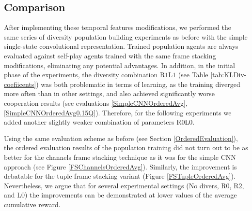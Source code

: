 \subsection{Comparison}
After implementing these temporal features modifications, we performed the same series of diversity population building experiments as before with the simple single-state convolutional representation.
Trained population agents are always evaluated against self-play agents trained with the same frame stacking modifications, eliminating any potential advantages.
In addition, in the initial phase of the experiments, the diversity combination R$1$L$1$ (see Table \ref{tab:KLDiv-coefiicents}) was both problematic in terms of learning, as the training diverged more often than in other settings, and also achieved significantly worse cooperation results (see evaluations \ref{SimpleCNNOrderedAvg}, \ref{SimpleCNNOrderedAvg0.15Q}).
Therefore, for the following experiments we added another slightly weaker combination of parameters R$0$L$0$.

Using the same evaluation scheme as before (see Section \ref{OrderedEvaluation}), the ordered evaluation results of the population training did not turn out to be as better for the channels frame stacking technique as it was for the simple CNN approach (see Figure \ref{FSChannelsOrderedAvg}).
Similarly, the improvement is debatable for the tuple frame stacking variant (Figure \ref{FSTupleOrderedAvg}).
Nevertheless, we argue that for several experimental settings (No divers, R$0$, R$2$, and L$0$) the improvements can be demonstrated at lower values of the average cumulative reward.

